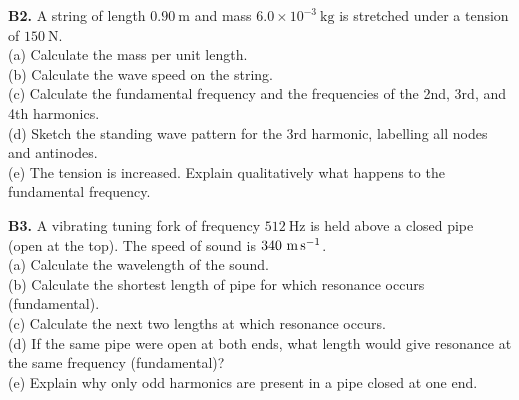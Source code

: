 \begin{exercisebox}[17]
\vspace{0.4cm}

\textbf{B2.} A string of length $0.90\ \text{m}$
and mass $6.0\times10^{-3}\ \text{kg}$ is stretched
under a tension of $150\ \text{N}$.\\[4pt]
(a) Calculate the mass per unit length.\\
(b) Calculate the wave speed on the string.\\
(c) Calculate the fundamental frequency and the
frequencies of the 2nd, 3rd, and 4th harmonics.\\
(d) Sketch the standing wave pattern for the
3rd harmonic, labelling all nodes and antinodes.\\
(e) The tension is increased. Explain qualitatively
what happens to the fundamental frequency.
\hfill{}

\vspace{0.4cm}

\textbf{B3.} A vibrating tuning fork of frequency
$512\ \text{Hz}$ is held above a closed pipe
(open at the top). The speed of sound is
$340\ \text{m\,s}^{-1}$.\\[4pt]
(a) Calculate the wavelength of the sound.\\
(b) Calculate the shortest length of pipe for
which resonance occurs (fundamental).\\
(c) Calculate the next two lengths at which
resonance occurs.\\
(d) If the same pipe were open at both ends,
what length would give resonance at the same
frequency (fundamental)?\\
(e) Explain why only odd harmonics are present
in a pipe closed at one end.
\hfill{}

\vspace{0.4cm}


\end{exercisebox}
